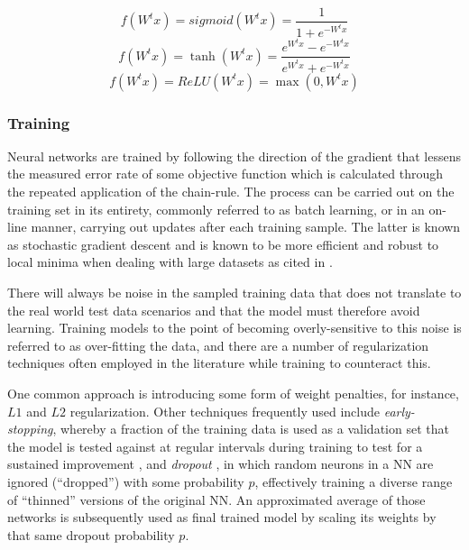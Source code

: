 \documentclass[../../fyp.tex]{subfiles}
\begin{document}
\begin{equation} \label{eq:sigmoid}
	f(W^tx) = sigmoid(W^tx) = \frac{1}{1+e^{-W^tx}}
\end{equation}
\begin{equation} \label{eq:hyperbolic_tangent}
	f(W^tx) = \tanh(W^tx) = \frac{e^{W^tx}-e^{-W^tx}}{e^{W^tx}+e^{-W^tx}}
\end{equation}
\begin{equation} \label{eq:relu}
	f(W^tx) = ReLU(W^tx) = \max(0,W^tx)
\end{equation}

\subsubsection{Training}
Neural networks are trained by following the direction of the gradient that lessens the measured error rate of some objective function which is calculated through the repeated application of the chain-rule. The process can be carried out on the training set in its entirety, commonly referred to as batch learning, or in an on-line manner, carrying out updates after each training sample. The latter is known as stochastic gradient descent and is known to be more efficient and robust to local minima when dealing with large datasets \citep{lecun1998} as cited in \citep{graves2012b}.

There will always be noise in the sampled training data that does not translate to the real world test data scenarios and that the model must therefore avoid learning. Training models to the point of becoming overly-sensitive to this noise is referred to as over-fitting the data, and there are a number of regularization techniques often employed in the literature while training to counteract this.

One common approach is introducing some form of weight penalties, for instance, $L1$ and $L2$ regularization. Other techniques frequently used include \textit{early-stopping}, whereby a fraction of the training data is used as a validation set that the model is tested against at regular intervals during training to test for a sustained improvement \citep{graves2012}, and \textit{dropout} \citep{srivastava2014}, in which random neurons in a NN are ignored (\enquote{dropped}) with some probability $p$, effectively training a diverse range of \enquote{thinned} versions of the original NN. An approximated average of those networks is subsequently used as final trained model by scaling its weights by that same dropout probability $p$.
\end{document}
